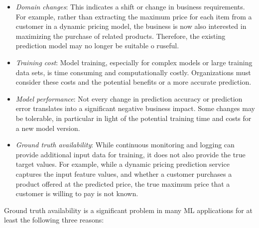 \begin{itemize}
   \item \emph{Domain changes}: This indicates a shift or change in business requirements. For example, rather than extracting the maximum price for each item from a customer in a dynamic pricing model, the business is now also interested in maximizing the purchase of related products. Therefore, the existing prediction model may no longer be suitable o ruseful.
   \item \emph{Training cost}: Model training, especially for complex models or large training data sets, is time consuming and computationally costly. Organizations must consider these costs and the potential benefits or a more accurate prediction.
   \item \emph{Model performance}: Not every change in prediction accuracy or prediction error translates into a significant negative business impact. Some changes may be tolerable, in particular in light of the potential training time and costs for a new model version.
   \item \emph{Ground truth availability}: While continuous monitoring and logging can provide additional input data for training, it does not also provide the true target values. For example, while a dynamic pricing prediction service captures the input feature values, and whether a customer purchases a product offered at the predicted price, the true maximum price that a customer is willing to pay is not known.
\end{itemize}

Ground truth availability is a significant problem in many ML applications for at least the following three reasons:

